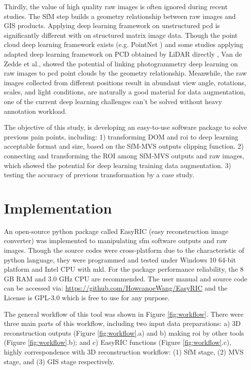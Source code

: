 \documentclass{configs/bmcart}
\begin{document}
Thirdly, the value of high quality raw images is often ignored during recent studies. The SfM step  builds a geometry relationship between raw images and GIS products. Applying deep learning framework on unstructured \acrfull*{pcd} is significantly different with on structured matrix image data. Though the point cloud deep learning framework exists (e.g. PointNet \cite{qi_pointnet_2017}) and some studies applying adapted deep learning framework on PCD obtained by LiDAR directly \cite{jin_deep_2018, jin_stemleaf_2019, jin_non-destructive_2020}, Van de Zedde et al., \cite{van_plant-part_2019} showed the potential of linking photogrammetry deep learning on raw images to \acrfull*{pcd} point clouds by the geometry relationship. Meanwhile, the raw images collected from different positions result in abundant view angle, rotations, scales, and light conditions, are naturally a good material for data augmentation, one of the current deep learning challenges can't be solved without heavy annotation workload.

The objective of this study, is developing an easy-to-use software package to solve previous pain points, including: 1) transforming DOM and \acrfull*{roi} to deep learning acceptable format and size, based on the SfM-MVS outputs clipping function. 2) connecting and transforming the ROI among SfM-MVS outputs and raw images, which showed the potential for deep learning training data augmentation. 3) testing the accuracy of previous transformation by a case study.

\section*{Implementation}

An open-source python package called EasyRIC (easy reconstruction image converter) was implemented to manipulating \acrshort*{sfm} software outputs and raw images. Though the source codes were cross-platform due to the characteristic of python language, they were programmed and tested under Windows 10 64-bit platform and Intel CPU with \acrfull*{mkl}. For the package performance reliability, the 8 GB RAM and 3.0 GHz CPU are recommended. The user manual and source code can be accessed via: \url{https://github.com/HowcanoeWang/EasyRIC} and the License is GPL-3.0 which is free to use for any purpose.

The general workflow of this tool was shown in Figure \ref{fig:workflow}. There were three main parts of this workflow, including two input data preparations: a) 3D reconstruction outputs (Figure \ref{fig:workflow}.a) and b) making \acrfull*{roi} by other tools (Figure \ref{fig:workflow}.b); and c) EasyRIC functions (Figure \ref{fig:workflow}.c), highly correspondence with 3D reconstruction workflow: (1) SfM stage, (2) MVS stage, and (3) GIS stage respectively. 
\end{document}
